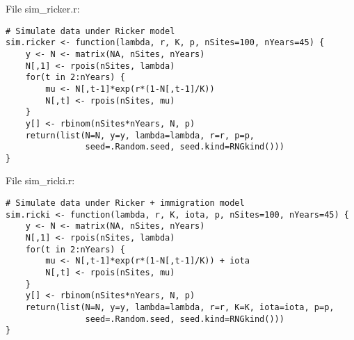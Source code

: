 \documentclass[12pt]{article}
\begin{document}
File sim\_ricker.r:
\begin{verbatim}
# Simulate data under Ricker model
sim.ricker <- function(lambda, r, K, p, nSites=100, nYears=45) {
    y <- N <- matrix(NA, nSites, nYears)
    N[,1] <- rpois(nSites, lambda)
    for(t in 2:nYears) {
        mu <- N[,t-1]*exp(r*(1-N[,t-1]/K))
        N[,t] <- rpois(nSites, mu)
    }
    y[] <- rbinom(nSites*nYears, N, p)
    return(list(N=N, y=y, lambda=lambda, r=r, p=p,
                seed=.Random.seed, seed.kind=RNGkind()))
}
\end{verbatim}

File sim\_ricki.r:
\begin{verbatim}
# Simulate data under Ricker + immigration model
sim.ricki <- function(lambda, r, K, iota, p, nSites=100, nYears=45) {
    y <- N <- matrix(NA, nSites, nYears)
    N[,1] <- rpois(nSites, lambda)
    for(t in 2:nYears) {
        mu <- N[,t-1]*exp(r*(1-N[,t-1]/K)) + iota
        N[,t] <- rpois(nSites, mu)
    }
    y[] <- rbinom(nSites*nYears, N, p)
    return(list(N=N, y=y, lambda=lambda, r=r, K=K, iota=iota, p=p,
                seed=.Random.seed, seed.kind=RNGkind()))
}
\end{verbatim}
\end{document}
